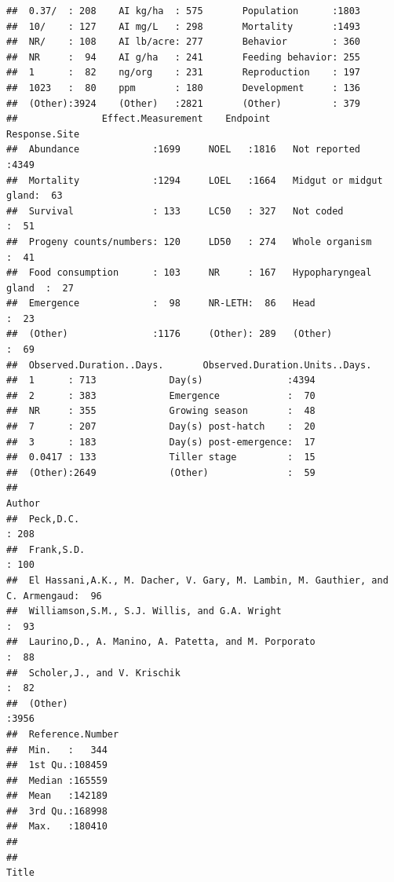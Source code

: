 \documentclass[]{article}
\begin{document}
\begin{verbatim}
##  0.37/  : 208    AI kg/ha  : 575       Population      :1803  
##  10/    : 127    AI mg/L   : 298       Mortality       :1493  
##  NR/    : 108    AI lb/acre: 277       Behavior        : 360  
##  NR     :  94    AI g/ha   : 241       Feeding behavior: 255  
##  1      :  82    ng/org    : 231       Reproduction    : 197  
##  1023   :  80    ppm       : 180       Development     : 136  
##  (Other):3924    (Other)   :2821       (Other)         : 379  
##               Effect.Measurement    Endpoint                   Response.Site 
##  Abundance             :1699     NOEL   :1816   Not reported          :4349  
##  Mortality             :1294     LOEL   :1664   Midgut or midgut gland:  63  
##  Survival              : 133     LC50   : 327   Not coded             :  51  
##  Progeny counts/numbers: 120     LD50   : 274   Whole organism        :  41  
##  Food consumption      : 103     NR     : 167   Hypopharyngeal gland  :  27  
##  Emergence             :  98     NR-LETH:  86   Head                  :  23  
##  (Other)               :1176     (Other): 289   (Other)               :  69  
##  Observed.Duration..Days.       Observed.Duration.Units..Days.
##  1      : 713             Day(s)               :4394          
##  2      : 383             Emergence            :  70          
##  NR     : 355             Growing season       :  48          
##  7      : 207             Day(s) post-hatch    :  20          
##  3      : 183             Day(s) post-emergence:  17          
##  0.0417 : 133             Tiller stage         :  15          
##  (Other):2649             (Other)              :  59          
##                                                                            Author    
##  Peck,D.C.                                                                    : 208  
##  Frank,S.D.                                                                   : 100  
##  El Hassani,A.K., M. Dacher, V. Gary, M. Lambin, M. Gauthier, and C. Armengaud:  96  
##  Williamson,S.M., S.J. Willis, and G.A. Wright                                :  93  
##  Laurino,D., A. Manino, A. Patetta, and M. Porporato                          :  88  
##  Scholer,J., and V. Krischik                                                  :  82  
##  (Other)                                                                      :3956  
##  Reference.Number
##  Min.   :   344  
##  1st Qu.:108459  
##  Median :165559  
##  Mean   :142189  
##  3rd Qu.:168998  
##  Max.   :180410  
##                  
##                                                                                                                                         Title     

\end{verbatim}
\end{document}
